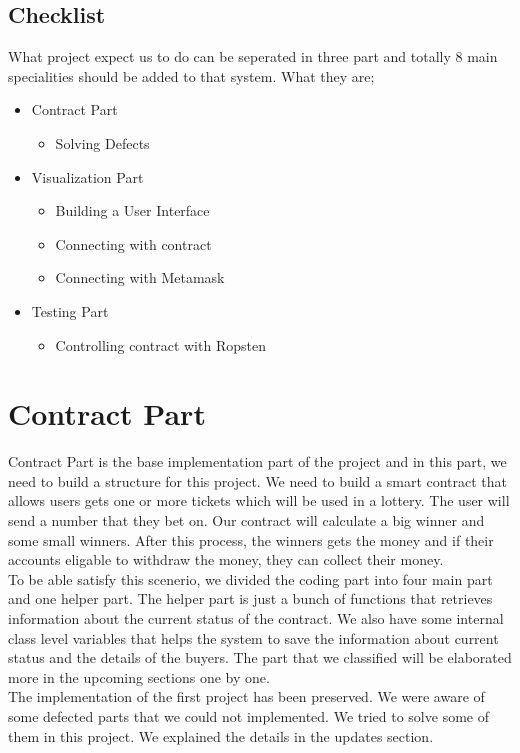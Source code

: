 \documentclass[]{scrreprt}
\begin{document}
\section{Checklist}
What project expect us to do can be seperated in three part and totally 8 main specialities should be added to that system. What they are;
\begin{itemize}
	\item 
	Contract Part
	\begin{itemize}
		\item 
		Solving Defects
	\end{itemize}
	\item 
	Visualization Part
	\begin{itemize}
		\item 
		Building a User Interface
		\item 
		Connecting with contract
		\item 
		Connecting with Metamask
	\end{itemize}
	\item 
	Testing Part
	\begin{itemize}
		\item 
		Controlling contract with Ropsten
	\end{itemize}
\end{itemize}
	\chapter{Contract Part}
	Contract Part is the base implementation part of the project and in this part, we need to build a structure for this project. We need to build a smart contract that allows users gets one or more tickets which will be used in a lottery. The user will send a number that they bet on. Our contract will calculate a big winner and some small winners. After this process, the winners gets the money and if their accounts eligable to withdraw the money, they can collect their money.\\
	To be able satisfy this scenerio, we divided the coding part into four main part and one helper part. The helper part is just a bunch of functions that retrieves information about the current status of the contract. We also have some internal class level variables that helps the system to save the information about current status and the details of the buyers. The part that we classified will be elaborated more in the upcoming sections one by one. \\
	The implementation of the first project has been preserved. We were aware of some defected parts that we could not implemented. We tried to solve some of them in this project. We explained the details in the updates section.
\end{document}
